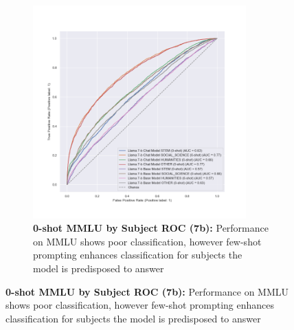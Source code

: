 \documentclass[11pt]{article}
\begin{document}
\begin{figure}
\begin{subfigure}[b]{0.38\textwidth}
         \centering \includegraphics[width=0.9\textwidth]{figures/0-shot-MMLU-subjects-7b-roc.png}
         \caption{\textbf{0-shot MMLU by Subject ROC (7b):} Performance on MMLU shows poor classification, however few-shot prompting enhances classification for subjects the model is predisposed to answer}
         \label{fig:0-shot-MMLU-ROC}
    \end{subfigure}
    

\end{figure}
\end{document}
